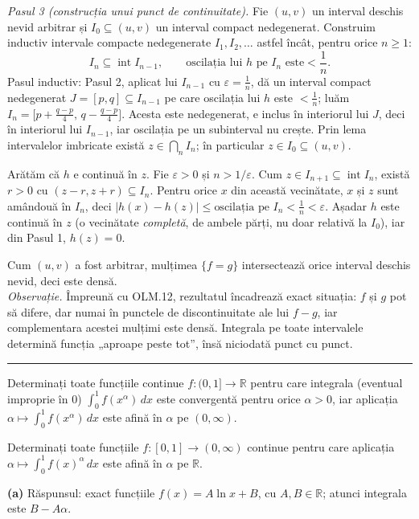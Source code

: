 \noindent\textit{Pasul 3 (construcția unui punct de continuitate).} Fie $(u,v)$ un
interval deschis nevid arbitrar și $I_0\subseteq(u,v)$ un interval compact
nedegenerat. Construim inductiv intervale compacte nedegenerate $I_1,I_2,\dots$
astfel încât, pentru orice $n\ge1$:
\[ I_n\subseteq\operatorname{int}I_{n-1},\qquad
   \text{oscilația lui $h$ pe $I_n$ este}<\frac1n . \]
Pasul inductiv: Pasul 2, aplicat lui $I_{n-1}$ cu $\varepsilon=\frac1n$, dă un
interval compact nedegenerat $J=[p,q]\subseteq I_{n-1}$ pe care oscilația lui $h$
este $<\frac1n$; luăm
$I_n=\bigl[p+\frac{q-p}{4},\,q-\frac{q-p}{4}\bigr]$. Acesta este nedegenerat, e
inclus în interiorul lui $J$, deci în interiorul lui $I_{n-1}$, iar oscilația pe
un subinterval nu crește. Prin lema intervalelor imbricate există
$z\in\bigcap_n I_n$; în particular $z\in I_0\subseteq(u,v)$.

Arătăm că $h$ e continuă în $z$. Fie $\varepsilon>0$ și $n>1/\varepsilon$. Cum
$z\in I_{n+1}\subseteq\operatorname{int}I_n$, există $r>0$ cu
$(z-r,z+r)\subseteq I_n$. Pentru orice $x$ din această vecinătate, $x$ și $z$ sunt
amândouă în $I_n$, deci $|h(x)-h(z)|\le\text{oscilația pe }I_n<\frac1n<\varepsilon$.
Așadar $h$ este continuă în $z$ (o vecinătate \emph{completă}, de ambele părți, nu
doar relativă la $I_0$), iar din Pasul 1, $h(z)=0$.

Cum $(u,v)$ a fost arbitrar, mulțimea $\{f=g\}$ intersectează orice interval
deschis nevid, deci este densă.\\[2pt]
\emph{Observație.} Împreună cu OLM.12, rezultatul încadrează exact situația: $f$ și
$g$ pot să difere, dar numai în punctele de discontinuitate ale lui $f-g$, iar
complementara acestei mulțimi este densă. Integrala pe toate intervalele determină
funcția „aproape peste tot'', însă niciodată punct cu punct.
\vspace{1mm}\hrule

\begin{parti}
  \item Determinați toate funcțiile continue $f:(0,1]\to\mathbb{R}$ pentru care
        integrala (eventual improprie în $0$) $\displaystyle\int_0^{1}f(x^{\alpha})\,dx$
        este convergentă pentru orice $\alpha>0$, iar aplicația
        $\alpha\mapsto\displaystyle\int_0^{1}f(x^{\alpha})\,dx$ este afină în
        $\alpha$ pe $(0,\infty)$.
  \item Determinați toate funcțiile $f:[0,1]\to(0,\infty)$ continue pentru care
        aplicația $\alpha\mapsto\displaystyle\int_0^{1}f(x)^{\alpha}\,dx$ este
        afină în $\alpha$ pe $\mathbb{R}$.
\end{parti}
\sol\noindent\textbf{(a)} Răspunsul: exact funcțiile $f(x)=A\ln x+B$, cu
$A,B\in\mathbb{R}$; atunci integrala este $B-A\alpha$.


